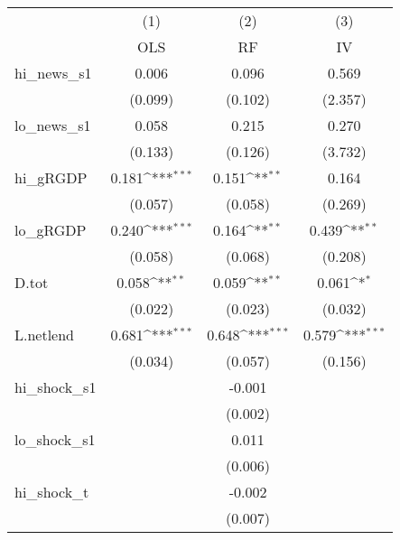 {
\def\sym#1{\ifmmode^{#1}\else\(^{#1}\)\fi}
\begin{tabular}{l*{3}{c}}
\toprule
            &\multicolumn{1}{c}{(1)}&\multicolumn{1}{c}{(2)}&\multicolumn{1}{c}{(3)}\\
            &\multicolumn{1}{c}{OLS}&\multicolumn{1}{c}{RF}&\multicolumn{1}{c}{IV}\\
\midrule
hi\_news\_s1  &       0.006         &       0.096         &       0.569         \\
            &     (0.099)         &     (0.102)         &     (2.357)         \\
\addlinespace
lo\_news\_s1  &       0.058         &       0.215         &       0.270         \\
            &     (0.133)         &     (0.126)         &     (3.732)         \\
\addlinespace
hi\_gRGDP    &       0.181\sym{***}&       0.151\sym{**} &       0.164         \\
            &     (0.057)         &     (0.058)         &     (0.269)         \\
\addlinespace
lo\_gRGDP    &       0.240\sym{***}&       0.164\sym{**} &       0.439\sym{**} \\
            &     (0.058)         &     (0.068)         &     (0.208)         \\
\addlinespace
D.tot       &       0.058\sym{**} &       0.059\sym{**} &       0.061\sym{*}  \\
            &     (0.022)         &     (0.023)         &     (0.032)         \\
\addlinespace
L.netlend   &       0.681\sym{***}&       0.648\sym{***}&       0.579\sym{***}\\
            &     (0.034)         &     (0.057)         &     (0.156)         \\
\addlinespace
hi\_shock\_s1 &                     &      -0.001         &                     \\
            &                     &     (0.002)         &                     \\
\addlinespace
lo\_shock\_s1 &                     &       0.011         &                     \\
            &                     &     (0.006)         &                     \\
\addlinespace
hi\_shock\_t  &                     &      -0.002         &                     \\
            &                     &     (0.007)         &                     \\

\end{tabular}}
